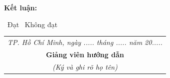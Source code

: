 \vspace{0.6cm}

\noindent
\textbf{Kết luận:}

\vspace{0.25cm}
\fbox{\rule{0pt}{1.3ex}\rule{1.3ex}{0pt}}~Đạt
\hspace{1.6cm}
\fbox{\rule{0pt}{1.3ex}\rule{1.3ex}{0pt}}~Không đạt

\vspace{3cm}

\begin{flushright}
		\begin{tabular}{c}
			\textit{TP. Hồ Chí Minh, ngày ..... tháng ..... năm 20.....}\\[0.2cm]
            \textbf{Giảng viên hướng dẫn}\\
            \textit{(Ký và ghi rõ họ tên)}
		\end{tabular}
	\end{flushright}